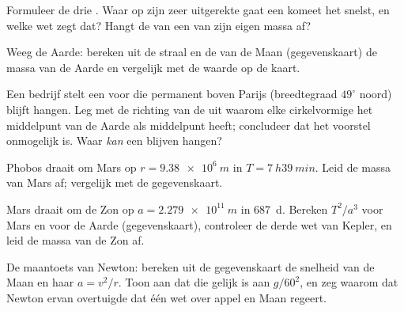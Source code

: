 \begin{exercise}[$\star$]\label{exo:g12:satellites-kepler:5}
Formuleer de drie . Waar op zijn zeer uitgerekte  gaat
een komeet het snelst, en welke wet zegt dat? Hangt de  van een
 van zijn eigen massa af?
\end{exercise}

\begin{exercise}[$\star\star$]\label{exo:g12:satellites-kepler:6}
Weeg de Aarde: bereken uit de straal en de  van de Maan
(gegevenskaart) de massa van de Aarde en vergelijk met de waarde op de kaart.
\end{exercise}

\begin{exercise}[$\star\star$]\label{exo:g12:satellites-kepler:7}
Een bedrijf stelt een  voor die permanent boven Parijs
(breedtegraad $49^\circ$ noord) blijft hangen. Leg met de richting van de
 uit waarom elke cirkelvormige  het middelpunt van de
Aarde als middelpunt heeft; concludeer dat het voorstel onmogelijk is. Waar
\emph{kan} een  blijven hangen?
\end{exercise}

\begin{exercise}[$\star\star$]\label{exo:g12:satellites-kepler:8}
Phobos draait om Mars op $r = \qty{9.38e6}{m}$ in $T = \qty{7}{h}
\qty{39}{min}$. Leid de massa van Mars af; vergelijk met de gegevenskaart.
\end{exercise}

\begin{exercise}[$\star\star$]\label{exo:g12:satellites-kepler:9}
Mars draait om de Zon op $a = \qty{2.279e11}{m}$ in \qty{687}{d}. Bereken
$T^2/a^3$ voor Mars en voor de Aarde (gegevenskaart), controleer de derde wet
van Kepler, en leid de massa van de Zon af.
\end{exercise}

\begin{exercise}[$\star\star$]\label{exo:g12:satellites-kepler:10}
De maantoets van Newton: bereken uit de gegevenskaart de snelheid van de Maan
en haar  $a = v^2/r$. Toon aan dat die gelijk
is aan $g/60^2$, en zeg waarom dat Newton ervan overtuigde dat één wet over
appel en Maan regeert.
\end{exercise}

